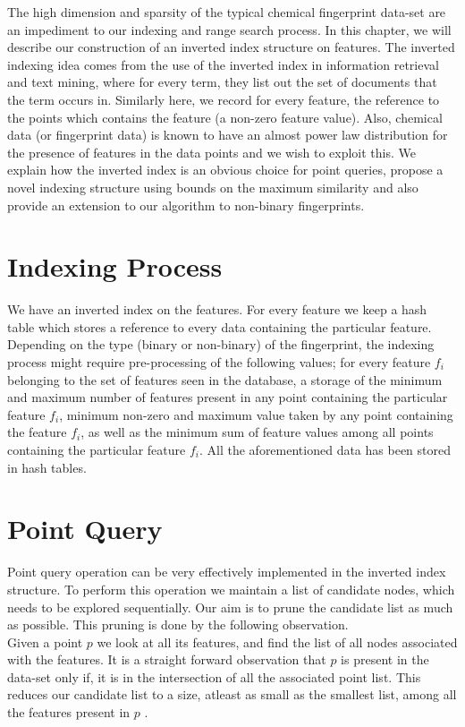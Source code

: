 
The high dimension and sparsity of the typical chemical fingerprint data-set are an impediment to our indexing and range search process. In this chapter, we will describe our construction of an inverted index structure on features. The inverted indexing idea comes from the use of the inverted index in information retrieval and text mining, where for every term, they list out the set of documents that the term occurs in. Similarly here, we record for every feature, the reference to the points which contains the feature (a non-zero feature value). Also, chemical data (or fingerprint data) is known to have an almost power law distribution for the presence of features in the data points and we wish to exploit this. We explain how the inverted index is an obvious choice for point queries, propose a novel indexing structure using bounds on the maximum similarity and also provide an extension to our algorithm to non-binary fingerprints. 


\section{Indexing Process}

We have an inverted index on the features. For every feature we keep a hash table which stores a reference to every data containing the particular feature. Depending on the type (binary or non-binary) of the fingerprint, the indexing process might require pre-processing of the following values; for every feature $f_i$ belonging to the set of features seen in the database, a storage of the minimum and maximum number of features present in any point containing the particular feature $f_i$, minimum non-zero and maximum value taken by any point containing the feature $f_i$, as well as the minimum sum of feature values among all points containing the particular feature $f_i$. All the aforementioned data has been stored in hash tables. 

\section{Point Query}

Point query operation can be very effectively implemented in the inverted index structure. To perform this operation we maintain a list of candidate nodes, which needs to be explored sequentially. Our aim is to prune the candidate list as much as possible. This pruning is done by the following observation.\\
Given a point $p$ we look at all its features, and find the list of all nodes associated with the features. It is a straight forward observation that $p$ is present in the data-set only if, it is in the intersection of all the associated point list. This reduces our candidate list to a size, atleast as small as the smallest list, among all the features present in $p$ .\\

